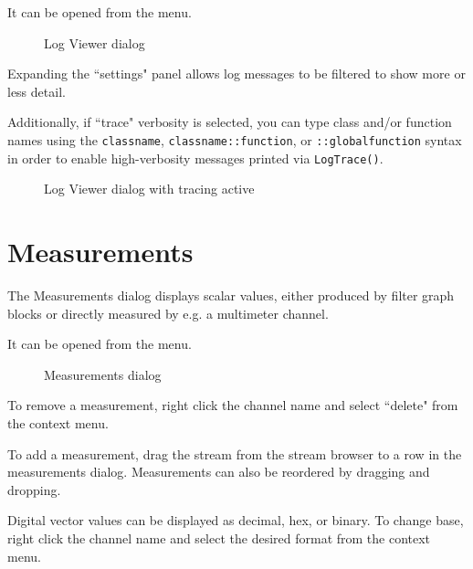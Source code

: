 It can be opened from the  menu.

\begin{figure}[H]
\centering
{}
\caption{Log Viewer dialog}
\label{fig:logviewer}
\end{figure}

Expanding the ``settings" panel allows log messages to be filtered to show more or less detail.

Additionally, if ``trace" verbosity is selected, you can type class and/or function names using the \texttt{classname},
\texttt{classname::function}, or \texttt{::globalfunction} syntax in order to enable high-verbosity messages printed
via \texttt{LogTrace()}.

\begin{figure}[H]
\centering
{}
\caption{Log Viewer dialog with tracing active}
\label{fig:logviewer-trace}
\end{figure}


\section{Measurements}
\label{dlg:measurements}

The Measurements dialog displays scalar values, either produced by filter graph blocks or directly measured by e.g. a
multimeter channel.

It can be opened from the  menu.

\begin{figure}[H]
\centering
{}
\caption{Measurements dialog}
\label{fig:measurements}
\end{figure}

To remove a measurement, right click the channel name and select ``delete" from the context menu.

To add a measurement, drag the stream from the stream browser to a row in the measurements dialog. Measurements can
also be reordered by dragging and dropping.

Digital vector values can be displayed as decimal, hex, or binary. To change base, right click the channel name and
select the desired format from the context menu.


